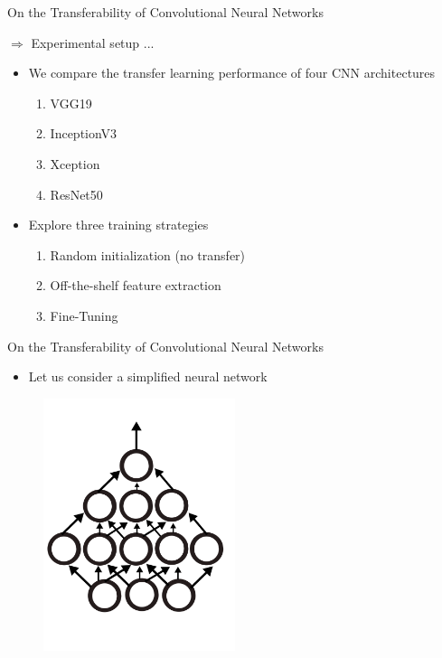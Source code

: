 \documentclass{beamer}
\begin{document}
\begin{frame}{On the Transferability of Convolutional Neural Networks}

	$\Rightarrow$ Experimental setup ...
	\bigskip

	\begin{itemize}
		\item We compare the transfer learning performance of four CNN architectures 
			\begin{enumerate}
				\item VGG19
				\item InceptionV3
				\item Xception
				\item ResNet50
			\end{enumerate}
	\end{itemize}
	\begin{itemize}
		\item Explore three training strategies
			\begin{enumerate}
				\item Random initialization (no transfer)
				\item Off-the-shelf feature extraction
				\item Fine-Tuning
			\end{enumerate}
	\end{itemize}

\end{frame}

\begin{frame}{On the Transferability of Convolutional Neural Networks}
	
	\bigskip

	\begin{itemize}
		\item Let us consider a simplified neural network
	\end{itemize}

	\bigskip

	\begin{figure}
		\includegraphics[width=0.5\textwidth]{figures/mlp.pdf}
	\end{figure}

\end{frame}
\end{document}
